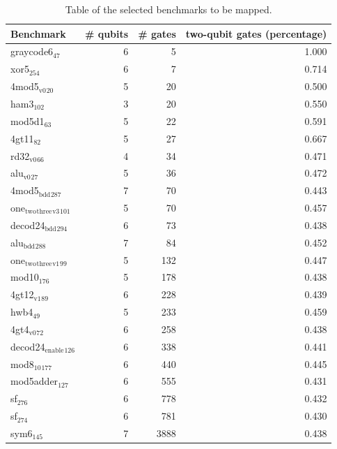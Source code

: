 \begin{table}[htbp]
\caption{\label{tab:map_selected_benchs}
Table of the selected benchmarks to be mapped.}
\centering
\small
\begin{tabular}{lrrr}
\hline
Benchmark & \# qubits & \# gates & two-qubit gates (percentage)\\
\hline
graycode6\(_{\text{47}}\) & 6 & 5 & 1.000\\
xor5\(_{\text{254}}\) & 6 & 7 & 0.714\\
4mod5\(_{\text{v0}}\)\(_{\text{20}}\) & 5 & 20 & 0.500\\
ham3\(_{\text{102}}\) & 3 & 20 & 0.550\\
mod5d1\(_{\text{63}}\) & 5 & 22 & 0.591\\
4gt11\(_{\text{82}}\) & 5 & 27 & 0.667\\
rd32\(_{\text{v0}}\)\(_{\text{66}}\) & 4 & 34 & 0.471\\
alu\(_{\text{v0}}\)\(_{\text{27}}\) & 5 & 36 & 0.472\\
4mod5\(_{\text{bdd}}\)\(_{\text{287}}\) & 7 & 70 & 0.443\\
one\(_{\text{two}}\)\(_{\text{three}}\)\(_{\text{v3}}\)\(_{\text{101}}\) & 5 & 70 & 0.457\\
decod24\(_{\text{bdd}}\)\(_{\text{294}}\) & 6 & 73 & 0.438\\
alu\(_{\text{bdd}}\)\(_{\text{288}}\) & 7 & 84 & 0.452\\
one\(_{\text{two}}\)\(_{\text{three}}\)\(_{\text{v1}}\)\(_{\text{99}}\) & 5 & 132 & 0.447\\
mod10\(_{\text{176}}\) & 5 & 178 & 0.438\\
4gt12\(_{\text{v1}}\)\(_{\text{89}}\) & 6 & 228 & 0.439\\
hwb4\(_{\text{49}}\) & 5 & 233 & 0.459\\
4gt4\(_{\text{v0}}\)\(_{\text{72}}\) & 6 & 258 & 0.438\\
decod24\(_{\text{enable}}\)\(_{\text{126}}\) & 6 & 338 & 0.441\\
mod8\(_{\text{10}}\)\(_{\text{177}}\) & 6 & 440 & 0.445\\
mod5adder\(_{\text{127}}\) & 6 & 555 & 0.431\\
sf\(_{\text{276}}\) & 6 & 778 & 0.432\\
sf\(_{\text{274}}\) & 6 & 781 & 0.430\\
sym6\(_{\text{145}}\) & 7 & 3888 & 0.438\\
\hline
\end{tabular}
\end{table}


